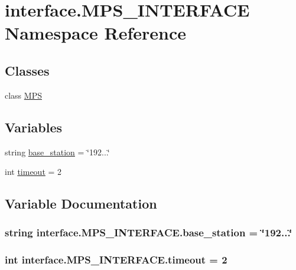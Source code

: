 \hypertarget{namespaceinterface_1_1MPS__INTERFACE}{}\section{interface.\+M\+P\+S\+\_\+\+I\+N\+T\+E\+R\+F\+A\+C\+E Namespace Reference}
\label{namespaceinterface_1_1MPS__INTERFACE}
\subsection*{Classes}
\begin{DoxyCompactItemize}
\item 
class \hyperlink{classinterface_1_1MPS__INTERFACE_1_1MPS}{M\+P\+S}
\end{DoxyCompactItemize}
\subsection*{Variables}
\begin{DoxyCompactItemize}
\item 
string \hyperlink{namespaceinterface_1_1MPS__INTERFACE_a9d82a8b1a10cfd7815ff45663b3a9e66}{base\+\_\+station} = \char`\"{}192...\char`\"{}
\item 
int \hyperlink{namespaceinterface_1_1MPS__INTERFACE_ab762fc1f41cb1386e8f861b6bb6c3897}{timeout} = 2
\end{DoxyCompactItemize}


\subsection{Variable Documentation}
\hypertarget{namespaceinterface_1_1MPS__INTERFACE_a9d82a8b1a10cfd7815ff45663b3a9e66}{}
\subsubsection[{base\+\_\+station}]{\setlength{\rightskip}{0pt plus 5cm}string interface.\+M\+P\+S\+\_\+\+I\+N\+T\+E\+R\+F\+A\+C\+E.\+base\+\_\+station = \char`\"{}192...\char`\"{}}\label{namespaceinterface_1_1MPS__INTERFACE_a9d82a8b1a10cfd7815ff45663b3a9e66}
\hypertarget{namespaceinterface_1_1MPS__INTERFACE_ab762fc1f41cb1386e8f861b6bb6c3897}{}
\subsubsection[{timeout}]{\setlength{\rightskip}{0pt plus 5cm}int interface.\+M\+P\+S\+\_\+\+I\+N\+T\+E\+R\+F\+A\+C\+E.\+timeout = 2}\label{namespaceinterface_1_1MPS__INTERFACE_ab762fc1f41cb1386e8f861b6bb6c3897}
